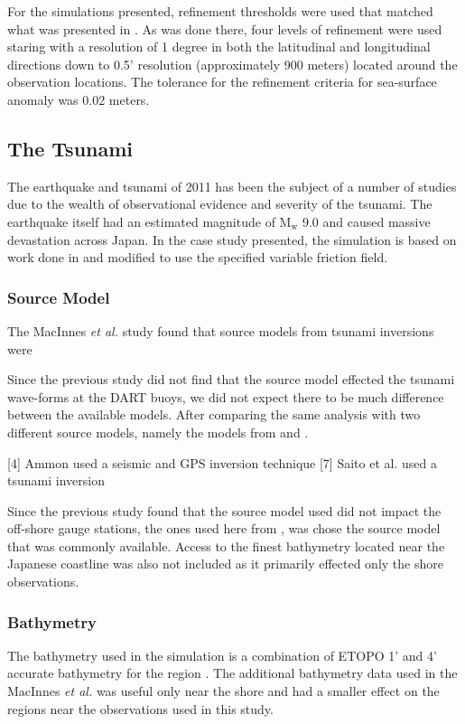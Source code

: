 For the simulations presented, refinement thresholds were used that matched what was presented in \cite{MacInnes:2013cr}.  As was done there, four levels of refinement were used staring with a resolution of 1 degree in both the latitudinal and longitudinal directions down to 0.5' resolution (approximately 900 meters) located around the observation locations.  The tolerance for the refinement criteria for sea-surface anomaly was 0.02 meters.


\subsection{The \tohoku Tsunami} \label{ssub:tohoku}

The \tohoku earthquake and tsunami of 2011 has been the subject of a number of studies due to the wealth of observational evidence and severity of the tsunami.  The earthquake itself had an estimated magnitude of $\text{M}_\text{w}$ 9.0 and caused massive devastation across Japan.  In the case study presented, the simulation is based on work done in \cite{MacInnes:2013cr} and modified to use the specified variable friction field.

\subsubsection{Source Model}

The MacInnes \emph{et al.} study found that source models from tsunami
inversions were 

Since the previous study \cite{MacInnes:2013cr} did not find that the source model effected the tsunami wave-forms at the DART buoys, we did not expect there to be much difference between the available models.  After comparing the same analysis with two different source models, namely the models from \cite{Ammon:2011dm} and .

[4] Ammon used a seismic and GPS inversion technique
[7] Saito et al. used a tsunami inversion

Since the previous study found that the source model used did not impact the off-shore gauge stations, the ones used here from \cite{Ammon:2011dm}, was chose the source model that was commonly available.  Access to the finest bathymetry located near the Japanese coastline was also not included as it primarily effected only the shore observations.

\subsubsection{Bathymetry}
The bathymetry used in the simulation is a combination of ETOPO 1' and 4' 
accurate bathymetry for the region \cite{Amante:2009ud}.  The additional 
bathymetry data used in the MacInnes \emph{et al.} was useful only near the
shore and had a smaller effect on the regions near the observations used in
this study.  

